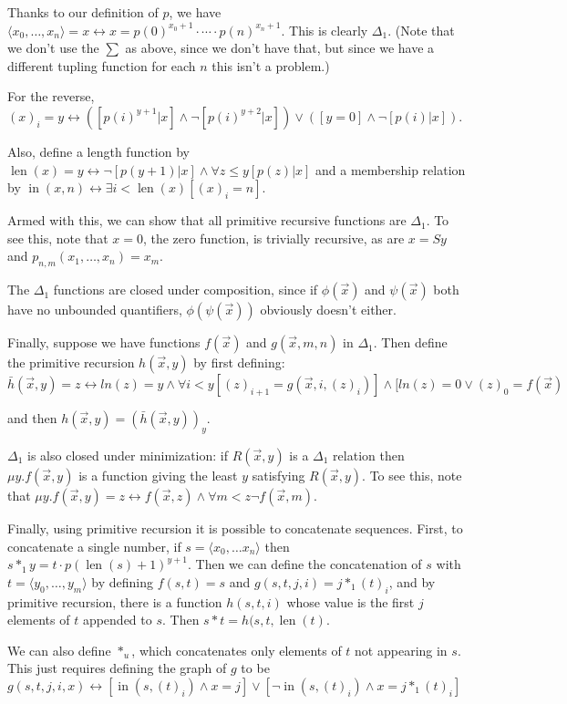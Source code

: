\documentclass[12pt]{article}
\begin{document}
Thanks to our definition of $p$, we have $\langle x_0,\ldots,x_n\rangle=x\leftrightarrow x=p(0)^{x_0+1}\cdot\cdots\cdot p(n)^{x_n+1}$.  This is clearly $\Delta_1$.  (Note that we don't use the $\sum$ as above, since we don't have that, but since we have a different tupling function for each $n$ this isn't a problem.)

For the reverse, $(x)_i=y\leftrightarrow \left([p(i)^{y+1}|x] \wedge \neg[p(i)^{y+2}|x]\right)\vee \left([y=0]\wedge \neg[p(i)|x]\right)$.

Also, define a length function by $\operatorname{len}(x)=y\leftrightarrow \neg [p(y+1)| x]\wedge\forall z\leq y[p(z)|x]$ and a membership relation by $\operatorname{in}(x,n)\leftrightarrow \exists i<\operatorname{len}(x) [(x)_i=n]$.

Armed with this, we can show that all primitive recursive functions are $\Delta_1$.  To see this, note that $x=0$, the zero function, is trivially recursive, as are $x=Sy$ and $p_{n,m}(x_1,\ldots,x_n)=x_m$.

The $\Delta_1$ functions are closed under composition, since if $\phi(\vec{x})$ and $\psi(\vec{x})$ both have no unbounded quantifiers, $\phi(\psi(\vec{x}))$ obviously doesn't either.

Finally, suppose we have functions $f(\vec{x})$ and $g(\vec{x},m,n)$ in $\Delta_1$.  Then define the primitive recursion $h(\vec{x},y)$ by first defining:
$$\bar{h}(\vec{x},y)=z\leftrightarrow ln(z)=y\wedge \forall i<y [(z)_{i+1}=g(\vec{x},i,(z)_i)]\wedge [ln(z)=0\vee (z)_0=f(\vec{x})$$

and then $h(\vec{x},y)=(\bar{h}(\vec{x},y))_y$.

$\Delta_1$ is also closed under minimization: if $R(\vec{x},y)$ is a $\Delta_1$ relation then $\mu y. f(\vec{x},y)$ is a function giving the least $y$ satisfying $R(\vec{x},y)$.  To see this, note that $\mu y. f(\vec{x},y)=z\leftrightarrow f(\vec{x},z)\wedge \forall m<z\neg f(\vec{x},m)$.

Finally, using primitive recursion it is possible to concatenate sequences.  First, to concatenate a single number, if $s=\langle x_0,\ldots x_n\rangle$ then $s*_1 y=t\cdot p(\operatorname{len}(s)+1)^{y+1}$.  Then we can define the concatenation of $s$ with $t=\langle y_0,\ldots,y_m\rangle$ by defining $f(s,t)=s$ and $g(s,t,j,i)=j*_1 (t)_i$, and by primitive recursion, there is a function $h(s,t,i)$ whose value is the first $j$ elements of $t$ appended to $s$.  Then $s*t=h(s,t,\operatorname{len}(t)$.

We can also define $*_u$, which concatenates only elements of $t$ not appearing in $s$.  This just requires defining the graph of $g$ to be $g(s,t,j,i,x)\leftrightarrow [\operatorname{in}(s,(t)_i)\wedge x=j] \vee [\neg\operatorname{in}(s,(t)_i)\wedge x=j*_1 (t)_i]$
\end{document}
